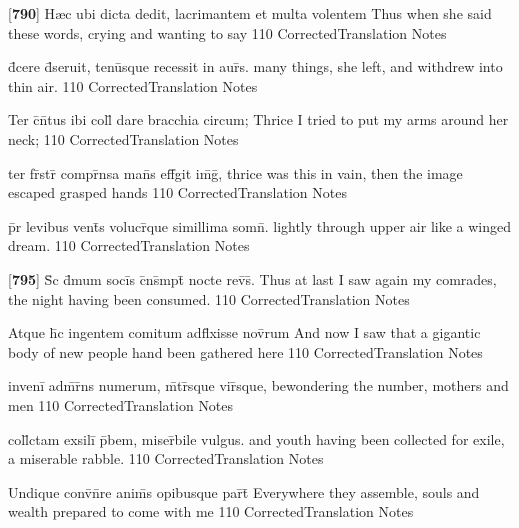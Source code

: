 \latline
  {[\textbf{790}] H{\ae}c ubi dicta dedit, lacrimantem et multa volentem}
  { Thus when she said these words, crying and wanting to say  }
  {110}
  { CorrectedTranslation }
  { Notes }


\latline
  {d\={\macron {\i}}cere d\={}seruit, tenu\={\macron {\i}}sque recessit in aur\={}s.}
  { many things, she left, and withdrew into thin air.  }
  {110}
  { CorrectedTranslation }
  { Notes }


\latline
  {Ter c\={}n\={}tus ibi coll\={} dare bracchia circum;}
  { Thrice I tried to put my arms around her neck;  }
  {110}
  { CorrectedTranslation }
  { Notes }


\latline
  {ter fr\={}str\={} compr\={}nsa man\={}s eff\={}git im\={}g\={},}
  { thrice was this in vain, then the image escaped grasped hands }
  {110}
  { CorrectedTranslation }
  { Notes }


\latline
  {p\={}r levibus vent\={\macron {\i}}s volucr\={\macron {\i}}que simillima somn\={}.}
  { lightly through upper air like a winged dream. }
  {110}
  { CorrectedTranslation }
  { Notes }


\latline
  {[\textbf{795}] S\={\macron {\i}}c d\={}mum soci\={}s c\={}ns\={}mpt\={} nocte rev\={\macron {\i}}s\={}.}
  { Thus at last I saw again my comrades, the night having been consumed.   }
  {110}
  { CorrectedTranslation }
  { Notes }


\latline
  {Atque h\={\macron {\i}}c ingentem comitum adfl\={}xisse nov\={}rum}
  { And now I saw that a gigantic body of new people hand been gathered here }
  {110}
  { CorrectedTranslation }
  { Notes }


\latline
  {inveni\={} adm\={\macron {\i}}r\={}ns numerum, m\={}tr\={}sque vir\={}sque,}
  { bewondering the number, mothers and men  }
  {110}
  { CorrectedTranslation }
  { Notes }


\latline
  {coll\={}ctam exsili\={} p\={}bem, miser\={}bile vulgus.}
  { and youth having been collected for exile, a miserable rabble. }
  {110}
  { CorrectedTranslation }
  { Notes }


\latline
  {Undique conv\={}n\={}re anim\={\macron {\i}}s opibusque par\={}t\={\macron {\i}}}
  { Everywhere they assemble, souls and wealth prepared to come with me }
  {110}
  { CorrectedTranslation }
  { Notes }


